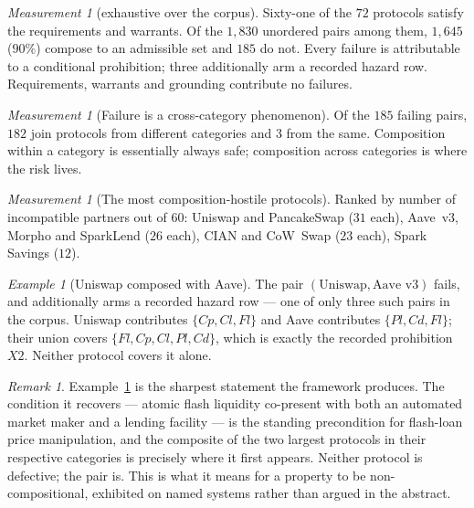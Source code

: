 \documentclass[11pt]{article}
\theoremstyle{definition}
\theoremstyle{plain}
\theoremstyle{remark}
\newtheorem{measurement}[definition]{Measurement}
\newtheorem{remark}[definition]{Remark}
\newtheorem{example}[definition]{Example}
\begin{document}
\begin{measurement}[exhaustive over the corpus]\label{meas:pairs}
Sixty-one of the $72$ protocols satisfy the requirements and warrants. Of the
$1{,}830$ unordered pairs among them, $1{,}645$ ($90\%$) compose to an admissible
set and $185$ do not. Every failure is attributable to a conditional prohibition;
three additionally arm a recorded hazard row. Requirements, warrants and
grounding contribute no failures.
\end{measurement}

\begin{measurement}[Failure is a cross-category phenomenon]\label{prop:crosscat}
Of the $185$ failing pairs, $182$ join protocols from different categories and
$3$ from the same. Composition within a category is essentially always safe;
composition across categories is where the risk lives.
\end{measurement}

\begin{measurement}[The most composition-hostile protocols]\label{prop:hostile}
Ranked by number of incompatible partners out of $60$: Uniswap and PancakeSwap
($31$ each), Aave~v3, Morpho and SparkLend ($26$ each), CIAN and CoW~Swap ($23$
each), Spark Savings ($12$).
\end{measurement}

\begin{example}[Uniswap composed with Aave]\label{ex:uniaave}
The pair $(\text{Uniswap}, \text{Aave~v3})$ fails, and additionally arms a
recorded hazard row --- one of only three such pairs in the corpus. Uniswap
contributes $\{Cp, Cl, Fl\}$ and Aave contributes $\{Pl, Cd, Fl\}$; their union
covers $\{Fl, Cp, Cl, Pl, Cd\}$, which is exactly the recorded prohibition $X2$.
Neither protocol covers it alone.
\end{example}

\begin{remark}
Example~\ref{ex:uniaave} is the sharpest statement the framework produces. The
condition it recovers --- atomic flash liquidity co-present with both an
automated market maker and a lending facility --- is the standing precondition
for flash-loan price manipulation, and the composite of the two largest protocols
in their respective categories is precisely where it first appears. Neither
protocol is defective; the pair is. This is what it means for a property to be
non-compositional, exhibited on named systems rather than argued in the abstract.
\end{remark}
\end{document}
